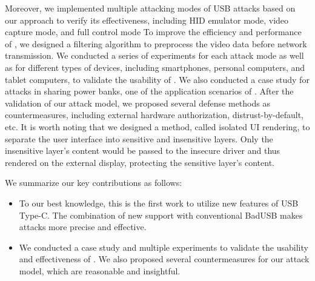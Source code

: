 Moreover, we implemented multiple attacking
modes of \ac{USB} attacks based on our approach to verify its effectiveness,
including \ac{HID} emulator mode, video capture mode, and full control mode  To improve the
efficiency and performance of \tool, we designed a filtering algorithm to
preprocess the video data before network transmission.
We conducted
a series of experiments for each attack mode as well as for different types of
devices, including smartphones, personal computers, and tablet computers, to
validate the usability of \tool.  We also conducted a case study for attacks in
sharing power banks, one of the application scenarios of \tool.
After the validation of our attack model, we
proposed several defense methods as countermeasures, including external
hardware authorization, distrust-by-default, etc.  It is worth noting that we
designed a method, called isolated \ac{UI} rendering, to separate the user interface
into sensitive and insensitive layers.  Only the insensitive layer's content would be passed to the insecure driver and thus rendered on the external display, protecting the sensitive layer's content.

We summarize our key contributions as follows:

\begin{itemize}

    \item To our best knowledge, this is the first work to utilize new features
	of \ac{USB} Type-C.  The combination of new support with conventional BadUSB
	makes attacks more precise and effective.


    \item We conducted a case study and multiple experiments to validate the
	usability and effectiveness of \tool.  We also proposed several
	countermeasures for our attack model, which are reasonable and
	insightful.
\end{itemize}

